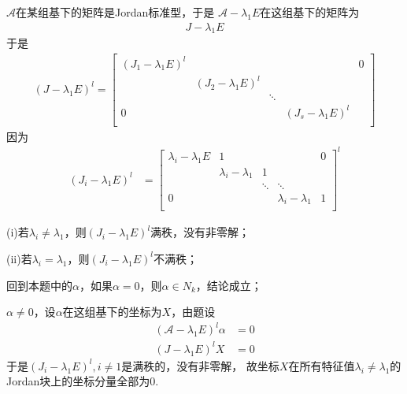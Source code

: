\documentclass{article}
\begin{document}
$\mathscr{A}$在某组基下的矩阵是Jordan标准型，于是
$\mathscr{A} - \lambda_1 E$在这组基下的矩阵为
\begin{align*}
  J - \lambda_1 E
\end{align*}
于是
\begin{align*}
  (J - \lambda_1 E)^l = \begin{bmatrix}
                          (J_1 - \lambda_1 E)^l &                       &        &                       & 0 \\
                                                & (J_2 - \lambda_1 E)^l &        &                       &   \\
                                                &                       & \ddots &                       &   \\
                          0                     &                       &        & (J_s - \lambda_1 E)^l &   \\
                        \end{bmatrix}
\end{align*}
因为
\begin{align*}
  (J_i - \lambda_1 E)^l & = \begin{bmatrix}
                              \lambda_i - \lambda_1 E & 1                     &        &                       & 0 \\
                                                      & \lambda_i - \lambda_1 & 1      &                       &   \\
                                                      &                       & \ddots & \ddots                &   \\
                              0                       &                       &        & \lambda_i - \lambda_1 & 1 \\
                            \end{bmatrix}^l
\end{align*}

(i)若$\lambda_i \neq \lambda_1$，则$(J_i - \lambda_1 E)^l$满秩，没有非零解；

(ii)若$\lambda_i = \lambda_1$，则$(J_i - \lambda_1 E)^l$不满秩；

回到本题中的$\alpha$，如果$\alpha = 0$，则$\alpha \in N_k$，结论成立；

$\alpha \neq 0$，设$\alpha$在这组基下的坐标为$X$，由题设
\begin{align*}
  (\mathscr{A} - \lambda_1 E)^l \alpha & = 0 \\
  (J - \lambda_1 E)^l X                & = 0
\end{align*}
于是$(J_i - \lambda_1 E)^l, i \neq 1$是满秩的，没有非零解，
故坐标$X$在所有特征值$\lambda_i \neq \lambda_1$的Jordan块上的坐标分量全部为0.
\end{document}
